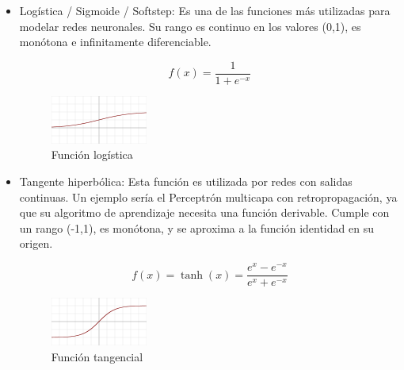 \begin{itemize}
\item Logística / Sigmoide / Softstep: Es una de las funciones más utilizadas para modelar redes neuronales. Su rango es continuo en los valores (0,1), es monótona e infinitamente diferenciable.
\begin{figure}[htp]
\centering
\begin{minipage}[b]{0.4\textwidth}
  \begin{equation}
  f(x) = \frac{1}{1+e^{-x}}
  \end{equation}
  \end{minipage}
\hfill
\begin{minipage}[b]{0.4\textwidth}
  \includegraphics[scale=0.8]{images/Activation_logistic.png}
  \caption{Función logística}
\end{minipage}
\end{figure}

\item Tangente hiperbólica: Esta función es utilizada por redes con salidas continuas. Un ejemplo sería el Perceptrón multicapa con retropropagación, ya que su algoritmo de aprendizaje necesita una función derivable. Cumple con un rango (-1,1), es monótona, y se aproxima a la función identidad en su origen.
\begin{figure}[H]
\centering
\begin{minipage}[b]{0.4\textwidth}
  \begin{equation}
  f(x) = \tanh(x) = \frac{e^{x}-e^{-x}}{e^{x}+e^{-x}}
  \end{equation}
  \end{minipage}
\hfill
\begin{minipage}[b]{0.4\textwidth}
  \includegraphics[scale=0.8]{images/Activation_tanh.png}
  \caption{Función tangencial}
\end{minipage}
\end{figure}


\end{itemize}
